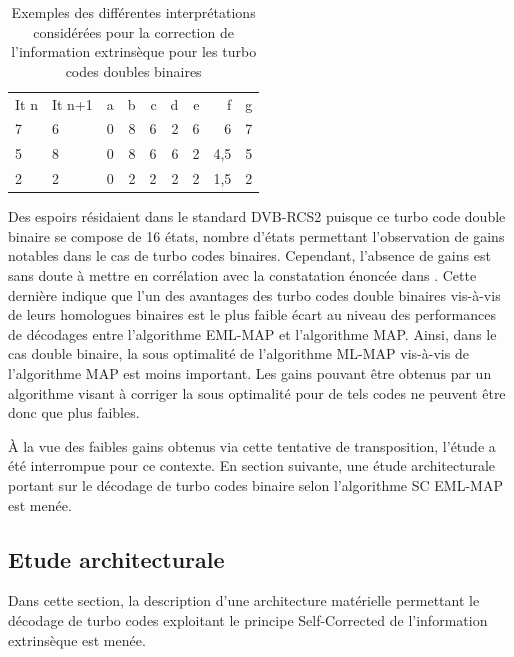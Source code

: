 \begin{table}[t]
	\centering
	\begin{tabular}{llrrrrrrr}
		\toprule
		    It n & It n+1 & a & b & c & d &e &f &g\\ 
		 \cmidrule(r){1-1} \cmidrule(r){2-2} \cmidrule(l){3-9} 
		 7 & 6 & 0 & 8 & 6 & 2 & 6 & 6  & 7 \\
		 5 & 8 & 0 & 8 & 6 & 6 & 2 & 4,5 & 5 \\
		 2 & 2 & 0 & 2 & 2 & 2 & 2 & 1,5 & 2 \\
		\bottomrule
	\end{tabular}
	\caption{Exemples des différentes interprétations considérées pour la correction de l'information extrinsèque pour les turbo codes doubles binaires}
	\label{tab:exsc}
\end{table}

Des espoirs résidaient dans le standard DVB-RCS2 puisque ce turbo code double binaire se compose de 16 états, nombre 
d'états permettant l'observation de gains notables dans le cas de turbo codes binaires. Cependant, l'absence de gains 
est sans doute à mettre en corrélation avec la constatation énoncée dans \cite{doublebinadvantages}. Cette dernière
indique que l'un des avantages des turbo codes double binaires vis-à-vis de leurs homologues binaires est le plus faible 
écart au niveau des performances de décodages entre l’algorithme EML-MAP et l'algorithme MAP. Ainsi, dans le cas double 
binaire, la sous optimalité de l'algorithme ML-MAP vis-à-vis de l'algorithme MAP 
est moins important. Les gains pouvant être obtenus par un algorithme visant à corriger la sous optimalité pour de tels 
codes ne peuvent être donc que plus faibles.

À la vue des faibles gains obtenus via cette tentative de transposition, l'étude a été interrompue
pour ce contexte. En section suivante, une étude architecturale portant sur le décodage de turbo codes binaire selon 
l'algorithme SC EML-MAP est menée.

\subsection{Etude architecturale}
Dans cette section, la description d'une architecture matérielle permettant le décodage de turbo codes exploitant le principe 
Self-Corrected de l'information extrinsèque est menée. 

